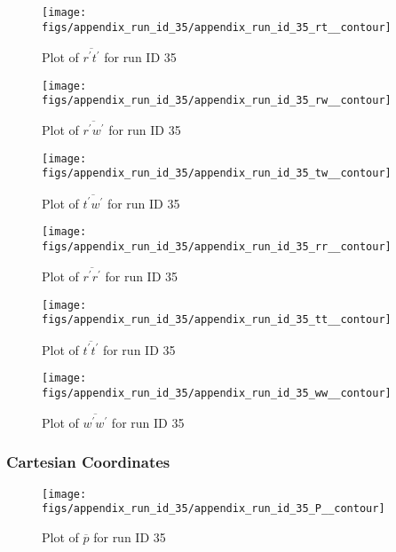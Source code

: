 \begin{figure}[H]
\centering
\texttt{[image: figs/appendix\_run\_id\_35/appendix\_run\_id\_35\_rt\_\_contour]}
\caption{Plot of $\overline{r^\prime t^\prime}$ for run ID 35}
\label{fig:appendix_run_id_35_rt__contour}
\end{figure}


\begin{figure}[H]
\centering
\texttt{[image: figs/appendix\_run\_id\_35/appendix\_run\_id\_35\_rw\_\_contour]}
\caption{Plot of $\overline{r^\prime w^\prime}$ for run ID 35}
\label{fig:appendix_run_id_35_rw__contour}
\end{figure}


\begin{figure}[H]
\centering
\texttt{[image: figs/appendix\_run\_id\_35/appendix\_run\_id\_35\_tw\_\_contour]}
\caption{Plot of $\overline{t^\prime w^\prime}$ for run ID 35}
\label{fig:appendix_run_id_35_tw__contour}
\end{figure}


\begin{figure}[H]
\centering
\texttt{[image: figs/appendix\_run\_id\_35/appendix\_run\_id\_35\_rr\_\_contour]}
\caption{Plot of $\overline{r^\prime r^\prime}$ for run ID 35}
\label{fig:appendix_run_id_35_rr__contour}
\end{figure}


\begin{figure}[H]
\centering
\texttt{[image: figs/appendix\_run\_id\_35/appendix\_run\_id\_35\_tt\_\_contour]}
\caption{Plot of $\overline{t^\prime t^\prime}$ for run ID 35}
\label{fig:appendix_run_id_35_tt__contour}
\end{figure}


\begin{figure}[H]
\centering
\texttt{[image: figs/appendix\_run\_id\_35/appendix\_run\_id\_35\_ww\_\_contour]}
\caption{Plot of $\overline{w^\prime w^\prime}$ for run ID 35}
\label{fig:appendix_run_id_35_ww__contour}
\end{figure}


\subsubsection{Cartesian Coordinates}
\begin{figure}[H]
\centering
\texttt{[image: figs/appendix\_run\_id\_35/appendix\_run\_id\_35\_P\_\_contour]}
\caption{Plot of $\overline{p}$ for run ID 35}
\label{fig:appendix_run_id_35_P__contour}
\end{figure}


